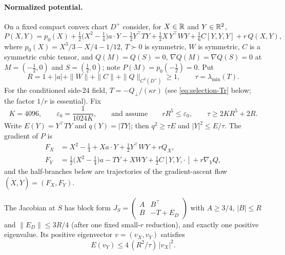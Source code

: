 \paragraph{Normalized potential.} On a fixed compact convex chart $D^+$ consider, for $X\in\mathbb R$ and $Y\in\mathbb R^2$,
\begin{equation}\label{eq:selection-potential}
P(X,Y)=p_0(X)+\tfrac12\bigl(X^2-\tfrac14\bigr)a\cdot Y-\tfrac12Y^{\top}TY+\tfrac12X\,Y^{\top}WY+\tfrac16C[Y,Y,Y]+r\,Q(X,Y),
\end{equation}
where $p_0(X)=X^3/3-X/4-1/12$, $T\succ0$ is symmetric, $W$ is symmetric, $C$ is a symmetric cubic tensor, and $Q(M)=Q(S)=0$, $\nabla Q(M)=\nabla Q(S)=0$ at $M=(-\frac12,0)$ and $S=(\frac12,0)$; note $P(M)=p_0(-\frac12)=0$. Put
\begin{equation}\label{eq:selection-R}
R=1+|a|+\|W\|+\|C\|+\|Q\|_{C^2(D^+)}\ge1,\qquad\tau=\lambda_{\min}(T).
\end{equation}
For the conditioned side-$24$ field, $T=-Q_\perp/(\kappa r)$ (see \eqref{eq:selection-Tr} below; the factor $1/r$ is essential). Fix
\begin{equation}\label{eq:selection-assume}
K=4096,\qquad\varepsilon_0=\frac1{1024K},\qquad\text{and assume}\qquad rR^5\le\varepsilon_0,\qquad\tau\ge2KR^5+2R .
\end{equation}
Write $E(Y)=Y^{\top}TY$ and $q(Y)=|TY|$; then $q^2\ge\tau E$ and $|Y|^2\le E/\tau$. The gradient of $P$ is
\begin{equation}\label{eq:selection-gradient}
\begin{aligned}
F_X&=X^2-\tfrac14+Xa\cdot Y+\tfrac12Y^{\top}WY+rQ_X,\\
F_Y&=\tfrac12\bigl(X^2-\tfrac14\bigr)a-TY+XWY+\tfrac12C[Y,Y,\cdot\,]+r\nabla_YQ,
\end{aligned}
\end{equation}
and the half-branches below are trajectories of the gradient-ascent flow $(\dot X,\dot Y)=(F_X,F_Y)$.

\begin{lemma}\label{lem:selection-slope}
The Jacobian at $S$ has block form $J_S=\begin{pmatrix}A&B^{\top}\\B&-T+E_D\end{pmatrix}$ with $A\ge3/4$, $|B|\le R$ and $\|E_D\|\le3R/4$ (after one fixed small-$r$ reduction), and exactly one positive eigenvalue. Its positive eigenvector $v=(v_X,v_Y)$ satisfies
\begin{equation}\label{eq:selection-slope}
E(v_Y)\le4\,(R^2/\tau)\,|v_X|^2 .
\end{equation}
\end{lemma}

